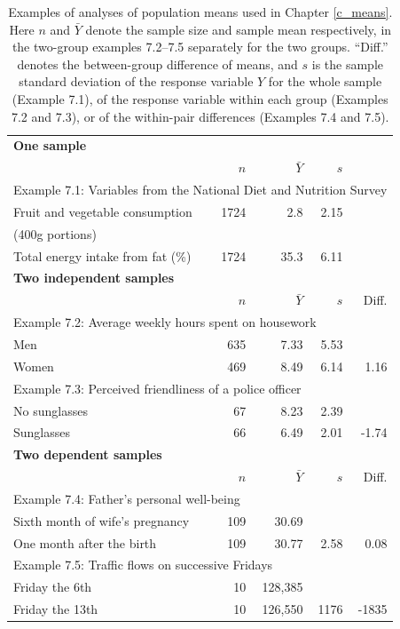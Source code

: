 \begin{table}
\caption{Examples of analyses of population means used in Chapter \ref{c_means}. Here $n$ and $\bar{Y}$ denote the sample size and sample mean respectively, in the two-group examples 7.2--7.5 separately for the two groups. ``Diff.'' denotes the between-group difference of means, and $s$ is the sample standard deviation of the response variable $Y$ for the whole sample (Example 7.1), of the response variable within each group (Examples 7.2 and 7.3), or of the within-pair differences (Examples 7.4 and 7.5).}
\label{t_groupex}
\begin{center}
\begin{tabular}{|lrrrr|}\hline
\multicolumn{5}{|l|}{\textbf{One sample}} \\
& $n$ & $\bar{Y}$ & $s$ &  \\ \hline
\multicolumn{5}{|l|}{Example 7.1: Variables from the National Diet and Nutrition Survey} \\
Fruit and vegetable consumption & 1724 & 2.8 & 2.15 & \\
(400g portions) & & & & \\[.5ex]
Total energy intake from fat (\%) & 1724 & 35.3& 6.11 & \\[1ex]
\hline
\multicolumn{5}{|l|}{\textbf{Two independent samples}} \\
& $n$ & $\bar{Y}$ & $s$& Diff.  \\ \hline
\multicolumn{5}{|l|}{Example 7.2: Average weekly hours spent on housework} \\
Men & 635 & 7.33 & 5.53 & \\
Women & 469 & 8.49 & 6.14 & 1.16 \\[1ex]
\multicolumn{5}{|l|}{Example 7.3: Perceived friendliness of a police officer} \\
No sunglasses & 67 & 8.23 & 2.39 &  \\
Sunglasses & 66 & 6.49 & 2.01 & -1.74 \\
\hline
\multicolumn{5}{|l|}{\textbf{Two dependent samples}}\\
& $n$ & $\bar{Y}$ & $s$ & Diff. \\ \hline
\multicolumn{5}{|l|}{Example 7.4: Father's personal well-being}\\
Sixth month of wife's pregnancy & 109 & 30.69 & & \\
One month after the birth & 109 & 30.77 & 2.58 & 0.08
\\[1ex]
\multicolumn{5}{|l|}{Example 7.5: Traffic flows on successive Fridays}\\
Friday the 6th & 10 & 128,385 & &   \\
Friday the 13th & 10 & 126,550 & 1176 & -1835 \\
\hline
\end{tabular}
\end{center}
\end{table}


